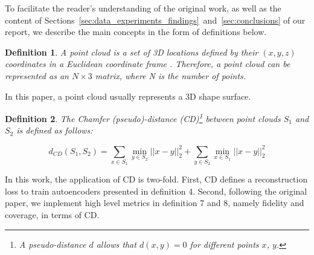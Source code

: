 \documentclass[12pt]{article}
\newtheorem{definition}{Definition}
\begin{document}
    To facilitate the reader's understanding of the original work, as well as the content of Sections~\ref{sec:data_experiments_findings}~and~\ref{sec:conclusions} of our report, we describe the main concepts in the form of definitions below.

    \begin{definition}
        \normalfont
        A \emph{point cloud} is a set of 3D locations defined by their $(x, y, z)$ coordinates in a Euclidean coordinate frame \cite{pmlr-v80-achlioptas18a}. Therefore, a point cloud can be represented as an $N \times 3$ matrix, where N is the number of points.
    \end{definition}

    In this paper, a point cloud usually represents a 3D shape surface.

    \begin{definition}
        \normalfont
        The \emph{Chamfer (pseudo)-distance (CD)}\footnote{
            A pseudo-distance $d$ allows that $d(x, y) = 0$ for different points $x$, $y$.} between point clouds $S_1$ and $S_2$ is defined as follows:

        \begin{equation}
            d_{CD}(S_{1}, S_{2}) =
            \sum_{x \in S_{1}} \min _{y \in S_{2}} || x - y||_{2}^{2} + \sum_{y \in S_{2}} \min_{x \in S_{1}} ||x - y||_{2}^{2}
            \label{equation:chamfer_distance}
        \end{equation}

    \end{definition}


    In this work, the application of CD is two-fold. First, CD defines a reconstruction loss to train autoencoders presented in definition 4. Second, following the original paper, we implement high level metrics in definition 7 and 8, namely fidelity and coverage, in terms of CD.
\end{document}
